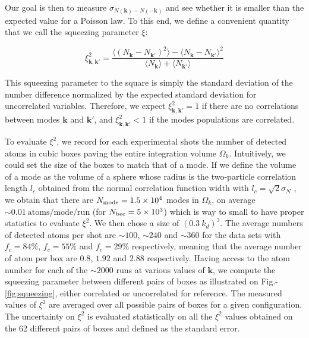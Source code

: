 Our goal is then to measure $\sigma_{N(\bm{k})-N(-\bm{k})}$ and see whether it is smaller than the expected value for a Poisson law. To this end, we define a convenient quantity that we call the squeezing parameter $\xi$: 

\begin{equation}
    \xi_{\bm{k},\bm{k'}}^2=\frac{\langle (N_{\bm{k}} - N_{\bm{k'}})^2 \rangle - \langle N_{\bm{k}} - N_{\bm{k'}} \rangle^2}{\langle N_{\bm{k}} \rangle + \langle N_{\bm{k'}} \rangle}
\end{equation}

This squeezing parameter to the square is simply the standard deviation of the number difference normalized by the expected standard deviation for uncorrelated variables. Therefore, we expect $\xi^2_{\bm{k},\bm{k}'}=1$ if there are no correlations between modes $\bm{k}$ and $\bm{k'}$, and $\xi^2_{\bm{k},\bm{k}'} < 1$ if the modes populations are correlated.

To evaluate $\xi^2$, we record for each experimental shots the number of detected atoms in cubic boxes paving the entire integration volume $\Omega_k$. Intuitively, we could set the size of the boxes to match that of a mode. If we define the volume of a mode as the volume of a sphere whose radius is the two-particle correlation length $l_c$ obtained from the normal correlation function width with $l_c = \sqrt{2} \sigma_N$ \cite{carcy2019momentum}, we obtain that there are $N_{\rm{mode}} = 1.5 \times 10^4$ modes in $\Omega_k$, \ie on average $\sim 0.01 \ \text{atoms/mode/run}$ (for $N_{\rm{bec}}=5 \times 10^3$) which is way to small to have proper statistics to evaluate $\xi^2$. We then chose a size of $(0.3 \ k_d)^3$. The average numbers of detected atoms per shot are $\sim 100$, $\sim 240$ and $\sim 360$ for the data sets with $f_c=84\%$, $f_c=55\%$ and $f_c=29\%$ respectively, meaning that the average number of atom per box are $0.8$, $1.92$ and $2.88$ respectively. Having access to the atom number for each of the $\sim 2000$ runs at various values of $\bm{k}$, we compute the squeezing parameter between different pairs of boxes as illustrated on Fig.-\ref{fig:squeezing}, either correlated or uncorrelated for reference. The measured values of $\xi^2$ are averaged over all possible pairs of boxes for a given configuration. The uncertainty on $\xi^2$ is evaluated statistically on all the $\xi^2$ values obtained on the 62 different pairs of boxes and defined as the standard error.

